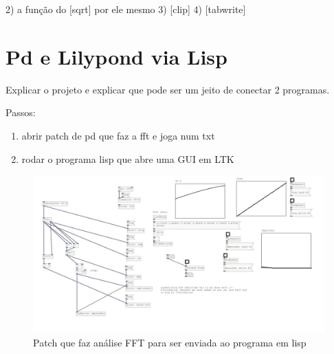 \documentclass[draft]{ppgmus}
\begin{document}
2) a função do [sqrt\texttildelow] por ele mesmo
3) [clip\texttildelow]
4) [tabwrite\texttildelow]

\section{Pd e Lilypond via Lisp}

Explicar o projeto e explicar que pode ser um jeito de conectar 2 programas.

Passos:

\begin{enumerate}
\item abrir patch de pd que faz a fft e joga num txt

\item rodar o programa lisp que abre uma GUI em LTK
\end{enumerate}



\begin{figure}
\includegraphics[scale=.6]{pd-lisp1}
\caption{Patch que faz análise FFT para ser enviada ao programa em lisp}
\label{pd-lisp1}
\end{figure} 



\end{document}
